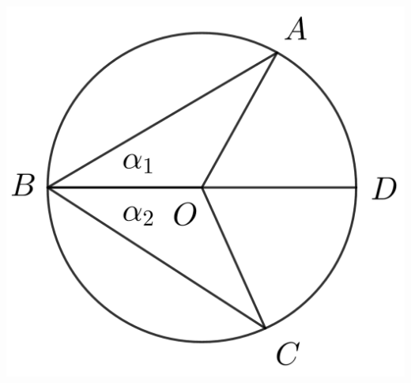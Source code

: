 \documentclass[12pt,a4paper]{article}
\begin{document}
\begin{center}
\includegraphics[scale=0.6]{circulo 1.png} 
\end{center} 
\end{document}
